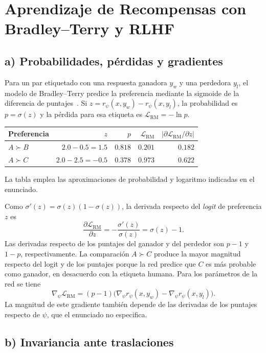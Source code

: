 \section{Aprendizaje de Recompensas con Bradley--Terry y RLHF}

\subsection*{a) Probabilidades, pérdidas y gradientes}

Para un par etiquetado con una respuesta ganadora $y_w$ y una perdedora
$y_l$, el modelo de Bradley--Terry predice la preferencia mediante la
sigmoide de la diferencia de puntajes~\cite{bradley1952,christiano2017}.
Si $z=r_\psi(x,y_w)-r_\psi(x,y_l)$, la probabilidad es $p=\sigma(z)$ y la
pérdida para esa etiqueta es $\mathcal{L}_{\mathrm{RM}}=-\ln p$.

\begin{center}
\begin{tabular}{lrrrr}
    \toprule
    Preferencia & $z$ & $p$ & $\mathcal{L}_{\mathrm{RM}}$ &
    $\lvert \partial\mathcal{L}_{\mathrm{RM}}/\partial z\rvert$ \\
    \midrule
    $A\succ B$ & $2.0-0.5=1.5$ & $0.818$ & $0.201$ & $0.182$ \\
    $A\succ C$ & $2.0-2.5=-0.5$ & $0.378$ & $0.973$ & $0.622$ \\
    \bottomrule
\end{tabular}
\end{center}

La tabla emplea las aproximaciones de probabilidad y logaritmo
indicadas en el enunciado.

Como $\sigma'(z)=\sigma(z)(1-\sigma(z))$, la derivada respecto del
\emph{logit} de preferencia $z$ es
\[
    \frac{\partial\mathcal{L}_{\mathrm{RM}}}{\partial z}
    =-\frac{\sigma'(z)}{\sigma(z)}
    =\sigma(z)-1.
\]
Las derivadas respecto de los puntajes del ganador y del perdedor son
$p-1$ y $1-p$, respectivamente. La comparación $A\succ C$ produce la
mayor magnitud respecto del logit y de los puntajes porque la red predice
que $C$ es más probable como ganador, en desacuerdo con la etiqueta
humana. Para los parámetros de la red se tiene
\[
    \nabla_\psi \mathcal{L}_{\mathrm{RM}}
    =(p-1)\bigl(\nabla_\psi r_\psi(x,y_w)-\nabla_\psi r_\psi(x,y_l)\bigr).
\]
La magnitud de este gradiente también depende de las derivadas de los
puntajes respecto de $\psi$, que el enunciado no especifica.

\subsection*{b) Invariancia ante traslaciones}

